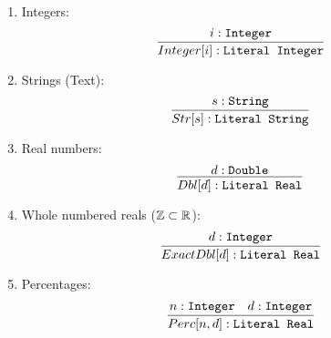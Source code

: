 \begin{enumerate}

    \item Integers:
        \[ \infer{\ofTy{Integer[i]}{Literal Integer}}{\ofTy{i}{Integer}} \]

    \item Strings (Text):
        \[ \infer{\ofTy{Str[s]}{Literal String}}{\ofTy{s}{String}} \]

    \item Real numbers:
        \[ \infer{\ofTy{Dbl[d]}{Literal Real}}{\ofTy{d}{Double}} \]

    \item Whole numbered reals (\(\mathbb{Z} \subset{} \mathbb{R}\)): 
        \[ \infer{\ofTy{ExactDbl[d]}{Literal Real}}{\ofTy{d}{Integer}} \]

    \item Percentages:
        \[ \infer{\ofTy{Perc[n,d]}{Literal Real}}{\ofTy{n}{Integer} & \ofTy{d}{Integer}} \]

\end{enumerate}

